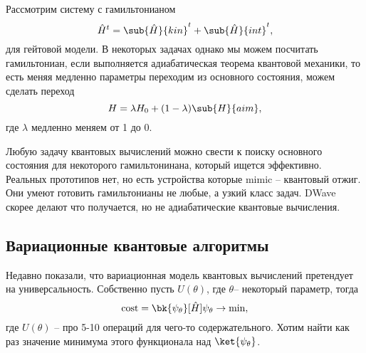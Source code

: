 Рассмотрим систему с гамильтонианом
\begin{equation*}
	\hat{H}^t = \sub{\hat{H}}{kin}^t + \sub{\hat{H}}{int}^t,
\end{equation*}
для гейтовой модели. В некоторых задачах однако мы можем посчитать гамильтониан, если выполняется адиабатическая теорема квантовой механики, то есть меняя медленно параметры переходим из основного состояния, можем сделать переход
\begin{equation*}
	H = \lambda H_0 + (1-\lambda) \sub{H}{aim},
\end{equation*}
где $\lambda$ медленно меняем от 1 до 0.

Любую задачу квантовых вычислений можно свести к поиску основного состояния для некоторого гамильтонинана, который ищется эффективно. Реальных прототипов нет, но есть устройства которые mimic -- квантовый отжиг. Они умеют готовить гамильтонианы не любые, а узкий класс задач. DWave скорее делают что получается, но не адиабатические квантовые вычисления. 



\subsection*{Вариационные квантовые алгоритмы}

Недавно показали, что вариационная модель квантовых вычислений претендует на универсальность. Собственно пусть $U(\theta)$, где $\theta$-- некоторый параметр, тогда
\begin{equation*}
	\text{cost} = \bk{\psi_\theta}[\hat{H}]{\psi_\theta} \to \min,
\end{equation*}
где $U(\theta)$ -- про 5-10 операций для чего-то содержательного. 
Хотим найти как раз значение минимума этого функционала над $\ket{\psi_\theta}$. 








